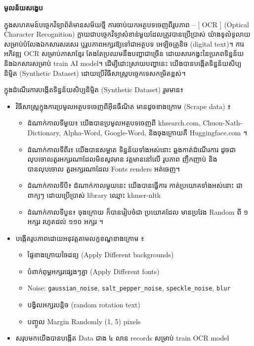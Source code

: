 \begin{adjustwidth}{0.2cm}{0.2cm}

    
    \begin{center}
        {\khmerfont\fontsize{15pt}{25pt}\selectfont \textbf{មូលន័យសង្ខេប} \par}
    \end{center}
    \label{khmer-abstract}
    
    \vspace{0.5cm}
    \khmernormal
    \small
    ក្នុងសហគមន៍បច្ចេកវិទ្យាព័ត៌មានសម័យថ្មី ការចាប់យកអត្ថបទចេញពីរូបភាព  – [ OCR ]
    (Optical Character Recognition) ក្លាយជាបច្ចេកវិទ្យាសំខាន់មួយដែលត្រូវបានប្រើប្រាស់
    យ៉ាងទូលំទូលាយ សម្រាប់បំលែងឯកសារសរសេរ ឬរូបភាពអក្សរឱ្យទៅជាអត្ថបទ អេឡិចត្រូនិច (digital text)។ 
    ការអភិវឌ្ឍ OCR សម្រាប់ភាសាខ្មែរ តែងតែប្រឈមនឹងបញ្ហាជាច្រើន ដោយសារកង្វះនៃប្រភពទិន្នន័យ 
    និងឯកសារសម្រាប់ train AI model។ ដើម្បីដោះស្រាយបញ្ហានេះ យើងបានបង្កើតទិន្នន័យសិប្បនិម្មិត 
    (Synthetic Dataset) ដោយប្រើវិធីសាស្ត្របច្ចេកទេសកម្រិតខ្ពស់។\par
    
    ក្នុងដំណើរការបង្កើតទិន្នន័យសិប្បនិម្មិត (Synthetic Dataset) រួមមាន៖
    \begin{itemize}
        \item វិធីសាស្ដ្រក្នុងការប្រមូលអត្ថបទចេញពីអ៊ីនធឺណិត មានដូចខាងក្រោម (Scrape data) ៖
        \begin{itemize}
            \item ដំណាក់កាលទីមួយ៖ យើងបានប្រមូលអត្ថបទចេញពី khsearch.com, Chuon-Nath-Dictionary, Alpha-Word, Google-Word, និងចុងក្រោយគឺ Huggingface.com ។
            \item ដំណាក់កាលទីពីរ៖ យើងបានសម្អាត ទិន្នន័យទាំងអស់នោះ ឆ្លងកាត់ដំណើរការ ដូចជា លុបចោលតួរអក្សរណាដែលមិនសូវមាន វត្តមាននៅលើ រូបភាព ញឹកញាប់ និងបានលុបចោល តួរអក្សរណាដែល Fonts renders អត់ចេញ។
            \item ដំណាក់កាលទីបី៖ ដំណាក់កាលមួយនេះ យើងបានធ្វើការ កាត់ប្រយោគទាំងអស់នោះ ជាពាក្យៗ ដោយប្រើប្រាស់ library ឈ្មោះ khmer-nltk
            \item ដំណាក់កាលទីបួន៖ ចុងក្រោយ ក៏បានរៀបចំជា ប្រយោគដែល មានប្រវែង Random ពី ១ អក្សរ រហូតដល់ ១១០ អក្សរ ។
        \end{itemize}
        \item បង្កើតរូបភាពដោយអនុវត្តតាមលក្ខខណ្ឌខាងក្រោម ៖ 
        \begin{itemize}
            \item ផ្ទៃខាងក្រោយចៃដន្យ (Apply Different backgrounds)
            \item បំពាក់ពុម្ពអក្សរផ្សេងៗគ្នា (Apply Different fonts)
            \item Noise: \texttt{gaussian\_noise}, \texttt{salt\_pepper\_noise}, \texttt{speckle\_noise}, \texttt{blur}
            \item បង្វិលអក្សរបន្តិច (random rotation text)
            \item បញ្ចូល Margin Randomly (1, 5) pixels
        \end{itemize}
        \item សរុបមកយើងបានបង្កើត Data ជាង ៤ លាន records សម្រាប់ train OCR model
    \end{itemize}
    \par
    

\end{adjustwidth}
